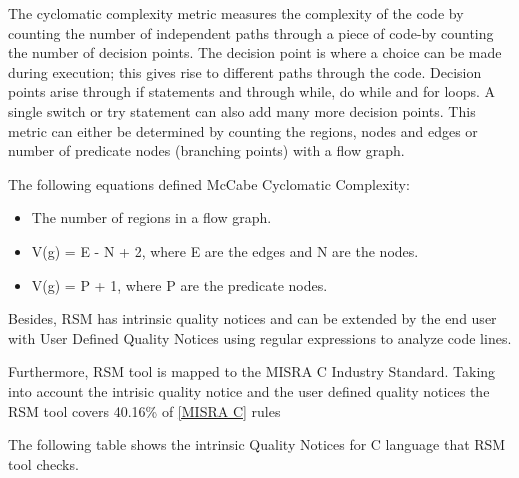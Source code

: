 The cyclomatic complexity metric measures the complexity of the code by counting the number of independent paths through a piece of code-by counting the number of decision points. The decision point is where a choice can be made during execution; this gives rise to different paths through the code. Decision points arise through if statements and through while, do while and for loops. A single switch or try statement can also add many more decision points. This metric can either be determined by counting the regions, nodes and edges or number of predicate nodes (branching points) with a flow graph.

The following equations defined McCabe Cyclomatic Complexity: 
\begin{itemize}
\item The number of regions in a flow graph.
\item V(g) = E - N + 2, where E are the edges and N are the nodes.
\item V(g) = P + 1, where P are the predicate nodes.
\end{itemize}

Besides, RSM has intrinsic quality notices and can be extended by the end user with User Defined Quality Notices using regular expressions to analyze code lines. 

Furthermore, RSM tool is mapped to the MISRA C Industry Standard. Taking into account the intrisic quality notice and the user defined quality notices the RSM tool covers 40.16\% of \href{http://msquaredtechnologies.com/m2rsm/docs/QualityStandards/MISRA_C_Mapping.htm}{[MISRA C]} rules

The following table shows the intrinsic Quality Notices for C language that RSM tool checks.

